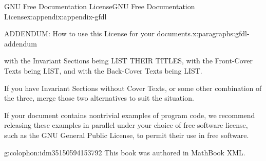 \documentclass[twoside,10pt,]{book}
\newcommand{\xreffont}{\relax}
\numberwithin{equation}{part}
\providecommand\phantomsection{}
\begin{document}
\begin{appendixptx}{GNU Free Documentation License}{}{GNU Free Documentation License}{}{}{x:appendix:appendix-gfdl}
\begin{paragraphs}{ADDENDUM: How to use this License for your documents.}{x:paragraphs:gfdl-addendum}
\begin{preformatted}
with the Invariant Sections being LIST THEIR TITLES, with the
Front-Cover Texts being LIST, and with the Back-Cover Texts being LIST.
\end{preformatted}
If you have Invariant Sections without Cover Texts, or some other combination of the three, merge those two alternatives to suit the situation.%
\par
If your document contains nontrivial examples of program code, we recommend releasing these examples in parallel under your choice of free software license, such as the GNU General Public License, to permit their use in free software.%
\end{paragraphs}%
\end{appendixptx}
%
\backmatter%
%
\clearpage\phantomsection%
%
%
{\xreffont\printindex}
%
\cleardoublepage
\pagestyle{empty}
\begin{backcolophon}{g:colophon:idm35150594153792}%
This book was authored in MathBook XML.%
\end{backcolophon}%
\end{document}
